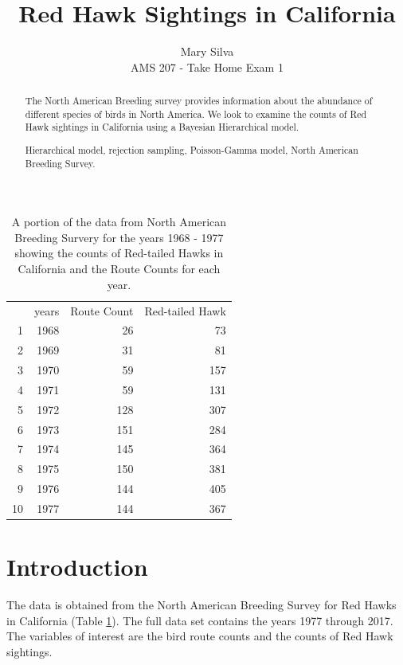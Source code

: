 \documentclass{asaproc}
\title{Red Hawk Sightings in California}
\author{Mary Silva\\
AMS 207 - Take Home Exam 1}
\begin{document}
\maketitle





\begin{abstract}
The North American Breeding survey provides information about the abundance of different species of birds in North America. We look to examine the counts of Red Hawk sightings in California using a Bayesian Hierarchical model.
\begin{keywords}
Hierarchical model, rejection sampling, Poisson-Gamma model, North American Breeding Survey.
\end{keywords}
\end{abstract}

\begin{table}[ht]
\centering
\caption{A portion of the data from North American Breeding Survery for the years 1968 - 1977 showing the counts of Red-tailed Hawks in California and the Route Counts for each year.}
\label{BirdDat}
\begin{tabular}{rrrr}\\\\
  \hline
 & years & Route Count & Red-tailed Hawk \\ 
  \hline
1 & 1968 &  26 &  73 \\ 
  2 & 1969 &  31 &  81 \\ 
  3 & 1970 &  59 & 157 \\ 
  4 & 1971 &  59 & 131 \\ 
  5 & 1972 & 128 & 307 \\ 
  6 & 1973 & 151 & 284 \\ 
  7 & 1974 & 145 & 364 \\ 
  8 & 1975 & 150 & 381 \\ 
  9 & 1976 & 144 & 405 \\ 
  10 & 1977 & 144 & 367 \\ 
   \hline
\end{tabular}

\end{table}



\section{Introduction}
The data is obtained from the North American Breeding Survey for Red Hawks in California (Table \ref{BirdDat}). The full data set contains the years 1977 through 2017. The variables of interest are the bird route counts and the counts of Red Hawk sightings.
\end{document}
